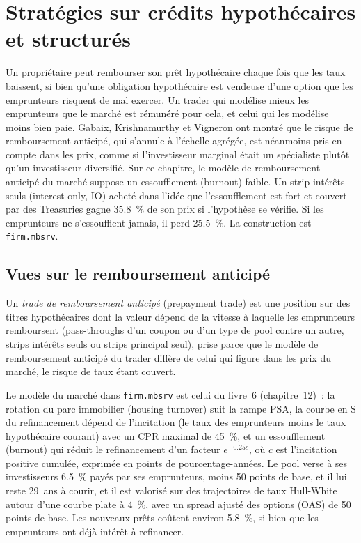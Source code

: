 \chapter{Stratégies sur crédits hypothécaires et structurés}\label{ch:s2:mortgage-and-structured-credit-strategies}

Un propriétaire peut rembourser son prêt hypothécaire chaque fois que les taux baissent, si bien qu'une obligation hypothécaire est vendeuse d'une option que les emprunteurs risquent de mal exercer. Un trader qui modélise
mieux les emprunteurs que le marché est rémunéré pour cela, et celui qui les modélise moins bien paie. Gabaix, Krishnamurthy et Vigneron ont montré que le risque de remboursement anticipé,
qui s'annule à l'échelle agrégée, est néanmoins pris en compte dans les prix, comme si l'investisseur marginal était un spécialiste plutôt qu'un investisseur diversifié. Sur ce
chapitre, le modèle de remboursement anticipé du marché suppose un essoufflement (burnout) faible. Un strip intérêts seuls (interest-only, IO) acheté dans l'idée que l'essoufflement est fort et
couvert par des Treasuries gagne 35.8~\% de son prix si l'hypothèse se vérifie. Si les emprunteurs ne s'essoufflent jamais, il perd 25.5~\%. La construction est
\texttt{firm.mbsrv}.

\section{Vues sur le remboursement anticipé}

\begin{definition}\label{def:s2:mortgage-and-structured-credit-strategies:prepaytrade}
Un \emph{trade de remboursement anticipé} (prepayment trade) est une position sur des titres hypothécaires dont la valeur dépend de la vitesse à laquelle les emprunteurs remboursent (pass-throughs
d'un coupon ou d'un type de pool contre un autre, strips intérêts seuls ou strips principal seul), prise parce que le modèle de remboursement anticipé du trader diffère de celui
qui figure dans les prix du marché, le risque de taux étant couvert.
\end{definition}

Le modèle du marché dans \texttt{firm.mbsrv} est celui du livre~6 (chapitre~12)~: la rotation du parc immobilier (housing turnover) suit la rampe PSA, la courbe en S du refinancement dépend de l'incitation (le
taux des emprunteurs moins le taux hypothécaire courant) avec un CPR maximal de 45~\%, et un essoufflement (burnout) qui réduit le refinancement d'un facteur $e^{-0.25 c}$, où $c$
est l'incitation positive cumulée, exprimée en points de pourcentage-années. Le pool verse à ses investisseurs 6.5~\% payés par ses emprunteurs, moins 50 points de base, et il lui reste 29~ans
à courir, et il est valorisé sur des trajectoires de taux Hull-White autour d'une courbe plate à 4~\%, avec un spread ajusté des options (OAS) de 50 points de base. Les nouveaux prêts coûtent environ 5.8~\%,
si bien que les emprunteurs ont déjà intérêt à refinancer.

